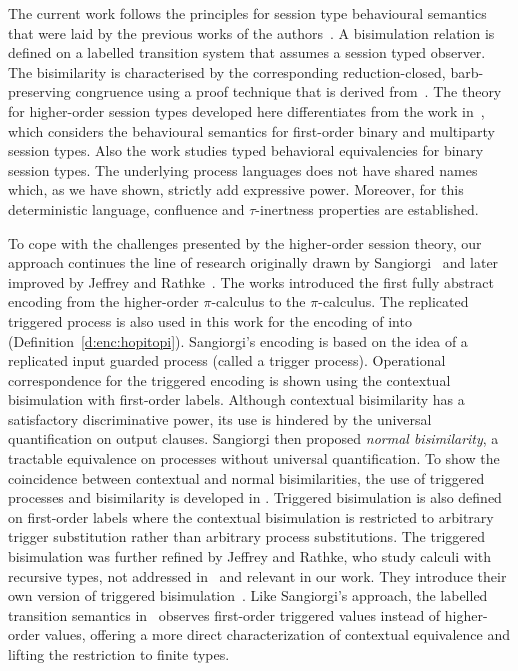 The current work follows the principles for
session type behavioural semantics that were laid
by the previous works of the
authors~\cite{dkphdthesis,DBLP:conf/forte/KouzapasYH11,KY13,DBLP:journals/iandc/PerezCPT14}.
A bisimulation relation is defined on a labelled
transition system that assumes a session typed
observer.
The bisimilarity is characterised by the corresponding
reduction-closed, barb-preserving congruence using a
proof technique that is derived from~\cite{Hennessy07}.
The theory for higher-order session types developed here
differentiates from 
the work in~\cite{dkphdthesis,DBLP:conf/forte/KouzapasYH11,KY13}, which 
considers the behavioural semantics for first-order
binary and multiparty session types.
Also the work \cite{DBLP:journals/iandc/PerezCPT14} studies typed behavioral equivalencies for binary session types.
The underlying process languages does not have shared names which, as we have shown, strictly add expressive power. 
Moreover, for this deterministic language, confluence and $\tau$-inertness properties are established.

To cope with the challenges presented by the higher-order
session theory, 
our approach continues the line of research 
originally drawn by Sangiorgi~\cite{San96H,SangiorgiD:expmpa}
and later improved by Jeffrey and Rathke~\cite{JeffreyR05}.
The works
\cite{San96H,SangiorgiD:expmpa}
introduced the first fully abstract encoding from the higher-order 
$\pi$-calculus to the $\pi$-calculus. 
The replicated triggered process 
is also used in this work for the encoding of \HOp into \sessp (Definition~\ref{d:enc:hopitopi}).
Sangiorgi's encoding is based on the idea of a replicated input guarded process 
(called a trigger process). Operational correspondence for
the triggered encoding is shown using the contextual bisimulation
with first-order labels.
Although contextual bisimilarity has a satisfactory discriminative power,
its use is hindered by the universal quantification on output clauses.
Sangiorgi then proposed \emph{normal bisimilarity}, a tractable  equivalence 
on processes without universal quantification. 
To show the coincidence between contextual and normal bisimilarities, 
the use of triggered processes and bisimilarity is developed in \cite{San96H}.
Triggered bisimulation is also defined on first-order labels
where the contextual bisimulation is restricted to arbitrary
trigger substitution rather than arbitrary process substitutions.
The triggered bisimulation was further refined by Jeffrey and
Rathke, who study calculi with recursive types, not addressed in~\cite{San96H,SangiorgiD:expmpa} and
relevant in our work.
They introduce their own version of triggered
bisimulation~\cite{JeffreyR05}.
Like Sangiorgi's approach, the labelled transition semantics
in~\cite{JeffreyR05}
observes first-order triggered values instead of
higher-order values, offering a more direct characterization of contextual equivalence
and lifting the restriction to finite types.


